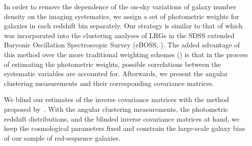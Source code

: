 \documentclass{aa}
\numberwithin{equation}{section}
\begin{document}

In order to remove the dependence of the on-sky variations of galaxy number density on the imaging systematics, we assign a set of photometric weights for galaxies in each redshift bin separately. Our strategy is similar to that of \citet{bautista2018sdss, icaza2020clustering} which was incorporated into the clustering analyses of LRGs in the SDSS extended Baryonic Oscillation Spectroscopic Survey (eBOSS, \citealt{dawson2016}). The added advantage of this method over the more traditional weighting schemes (\citealt{ross2017clustering, crocce2019dark}) is that in the process of estimating the photometric weights, possible correlations between the systematic variables are accounted for. Afterwards, we present the angular clustering measurements and their corresponding covariance matrices.

We blind our estimates of the inverse covariance matrices with the method proposed by~\citet{sellentin2019}. With the angular clustering measurements, the photometric redshift distributions, and the blinded inverse covariance matrices at hand, we keep the cosmological parameters fixed and constrain the large-scale galaxy bias of our sample of red-sequence galaxies. 

\end{document}
